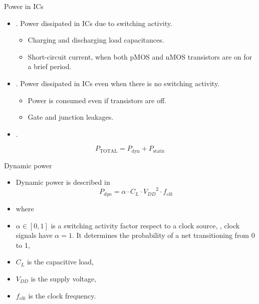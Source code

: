 \documentclass[]{slides}
\begin{document}
\begin{frame}{Power in ICs}{}
\begin{itemize}
\item {}. Power dissipated in \acp{IC} due to switching activity.
\begin{itemize}
  \item Charging and discharging load capacitances.
  \item Short-circuit current, when both pMOS and nMOS transistors are on for a brief period.
\end{itemize}
\item {}. Power dissipated in \acp{IC} even when there is no switching activity.
\begin{itemize}
  \item Power is consumed even if transistors are off.
  \item Gate and junction leakages.
\end{itemize}
\item {}.
\end{itemize}
\begin{equation}
P_{\mathrm{TOTAL}} = P_{\mathrm{dyn}} + P_{\mathrm{static}}
\end{equation}
\end{frame}

\begin{frame}{Dynamic power}{}
\begin{itemize}
\item Dynamic power is described in 
\begin{equation}
\label{eq:DynamicPower}
P_{dyn} = \alpha \cdot C_{L} \cdot {V_{DD}}^{2} \cdot f_{clk}
\end{equation} 
\item[]where
\item[]$\alpha \in [0,1]$ is a switching activity factor respect to a clock source, \ie, clock signals have $\alpha=1$. It determines the probability of a net transitioning from 0 to 1,
\item[]$C_{L}$ is the capacitive load,
\item[]${V_{DD}}$ is the supply voltage,
\item[]$f_{clk}$ is the clock frequency.
\end{itemize}
\end{frame}
\end{document}
